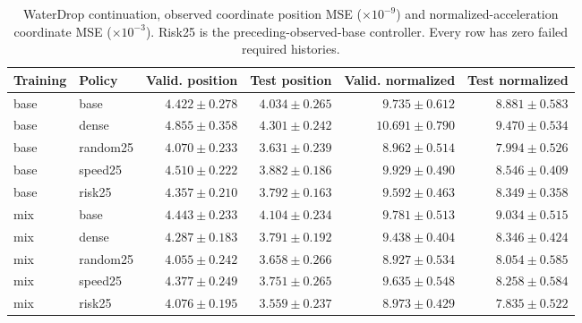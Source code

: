 \begin{table}[p]\centering\scriptsize
\caption{WaterDrop continuation, observed coordinate position MSE ($\times10^{-9}$) and normalized-acceleration coordinate MSE ($\times10^{-3}$). Risk25 is the preceding-observed-base controller. Every row has zero failed required histories.}
\label{tab:waterdrop110k-observed}
\begin{tabular}{llrrrr}\toprule
Training & Policy & Valid. position & Test position & Valid. normalized & Test normalized\\\midrule
base & base & $4.422\pm0.278$ & $4.034\pm0.265$ & $9.735\pm0.612$ & $8.881\pm0.583$\\
base & dense & $4.855\pm0.358$ & $4.301\pm0.242$ & $10.691\pm0.790$ & $9.470\pm0.534$\\
base & random25 & $4.070\pm0.233$ & $3.631\pm0.239$ & $8.962\pm0.514$ & $7.994\pm0.526$\\
base & speed25 & $4.510\pm0.222$ & $3.882\pm0.186$ & $9.929\pm0.490$ & $8.546\pm0.409$\\
base & risk25 & $4.357\pm0.210$ & $3.792\pm0.163$ & $9.592\pm0.463$ & $8.349\pm0.358$\\
mix & base & $4.443\pm0.233$ & $4.104\pm0.234$ & $9.781\pm0.513$ & $9.034\pm0.515$\\
mix & dense & $4.287\pm0.183$ & $3.791\pm0.192$ & $9.438\pm0.404$ & $8.346\pm0.424$\\
mix & random25 & $4.055\pm0.242$ & $3.658\pm0.266$ & $8.927\pm0.534$ & $8.054\pm0.585$\\
mix & speed25 & $4.377\pm0.249$ & $3.751\pm0.265$ & $9.635\pm0.548$ & $8.258\pm0.584$\\
mix & risk25 & $4.076\pm0.195$ & $3.559\pm0.237$ & $8.973\pm0.429$ & $7.835\pm0.522$\\
\bottomrule\end{tabular}\end{table}


